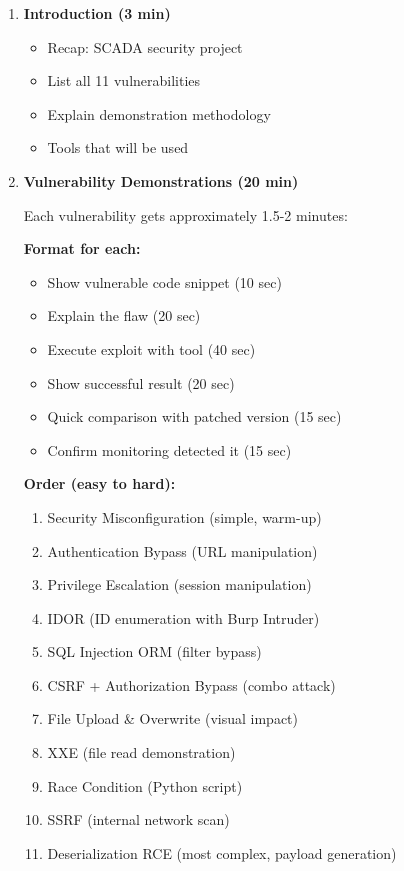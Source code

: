 \documentclass[12pt,a4paper]{article}
\begin{document}
\begin{enumerate}[leftmargin=*]
    \item \textbf{Introduction (3 min)}
    \begin{itemize}
        \item Recap: SCADA security project
        \item List all 11 vulnerabilities
        \item Explain demonstration methodology
        \item Tools that will be used
    \end{itemize}
    
    \item \textbf{Vulnerability Demonstrations (20 min)}
    
    Each vulnerability gets approximately 1.5-2 minutes:
    
    \textbf{Format for each:}
    \begin{itemize}
        \item Show vulnerable code snippet (10 sec)
        \item Explain the flaw (20 sec)
        \item Execute exploit with tool (40 sec)
        \item Show successful result (20 sec)
        \item Quick comparison with patched version (15 sec)
        \item Confirm monitoring detected it (15 sec)
    \end{itemize}
    
    \textbf{Order (easy to hard):}
    \begin{enumerate}
        \item Security Misconfiguration (simple, warm-up)
        \item Authentication Bypass (URL manipulation)
        \item Privilege Escalation (session manipulation)
        \item IDOR (ID enumeration with Burp Intruder)
        \item SQL Injection ORM (filter bypass)
        \item CSRF + Authorization Bypass (combo attack)
        \item File Upload \& Overwrite (visual impact)
        \item XXE (file read demonstration)
        \item Race Condition (Python script)
        \item SSRF (internal network scan)
        \item Deserialization RCE (most complex, payload generation)
    \end{enumerate}
    

\end{enumerate}
\end{document}
